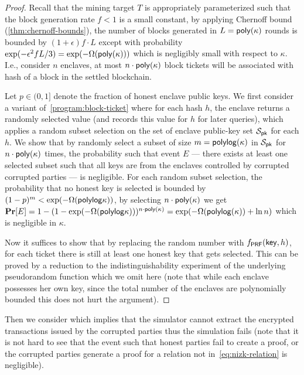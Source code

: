 \begin{proof}
	Recall that the mining target $T$ is appropriately parameterized such that the block generation rate $f < 1$ is a small constant, by applying Chernoff bound (\cref{thm:chernoff-bounds}), the number of blocks generated in $L = \mathsf{poly}(\kappa)$ rounds is bounded by $(1 + \epsilon)f \cdot L$ except with probability $\exp(- \epsilon^2 f L / 3) = \exp(-\Omega(\mathsf{poly}(\kappa)))$ which is negligibly small with respect to $\kappa$.
	I.e., consider $n$ enclaves, at most $n \cdot \mathsf{poly}(\kappa)$ block tickets will be associated with hash of a block in the settled blockchain.

	Let $p \in (0 ,1]$ denote the fraction of honest enclave public keys.
	We first consider a variant of~\cref{program:block-ticket} where for each hash $h$, the enclave returns a randomly selected value (and records this value for $h$ for later queries), which applies a random subset selection on the set of enclave public-key set $\mathcal{S}_\mathsf{pk}$ for each $h$.
	We show that by randomly select a subset of size $m = \mathsf{polylog} (\kappa)$ in $\mathcal{S}_\mathsf{pk}$ for $n \cdot \mathsf{poly}(\kappa)$ times, the probability such that event $E$ --- there exists at least one selected subset such that all keys are from the enclaves controlled by corrupted corrupted parties --- is negligible.
	For each random subset selection, the probability that no honest key is selected is bounded by $(1 - p)^m < \exp(-\Omega(\mathsf{polylog}\kappa))$, by selecting $n \cdot \mathsf{poly}(\kappa)$ we get $\mathbf{Pr}[E] = 1 - (1 - \exp(-\Omega(\mathsf{polylog}\kappa)))^{n \cdot \mathsf{poly}(\kappa)} = \exp(-\Omega(\mathsf{polylog}(\kappa)) + \ln n)$ which is negligible in $\kappa$.

	Now it suffices to show that by replacing the random number with $f_\mathsf{PRF}(\mathsf{key}, h)$, for each ticket there is still at least one honest key that gets selected.
	This can be proved by a reduction to the indistinguishability experiment of the underlying pseudorandom function \fPRF which we omit here (note that while each enclave possesses her own key, since the total number of the enclaves are polynomially bounded this does not hurt the argument).
\end{proof}

Then we consider \badNIZK which implies that the simulator \simulator cannot extract the encrypted transactions issued by the corrupted parties thus the simulation fails (note that it is not hard to see that the event such that honest parties fail to create a proof, or the corrupted parties generate a proof for a relation not in~\cref{eq:nizk-relation} is negligible).

